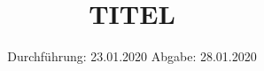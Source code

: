 
\usepackage{physics}
\usepackage{derivative}
\subject{VERSUCH NUMMER}
\title{TITEL}
\date{%
  Durchführung: 23.01.2020
  \hspace{3em}
  Abgabe: 28.01.2020
}



\maketitle
\thispagestyle{empty}
\tableofcontents
\newpage







\printbibliography{}


